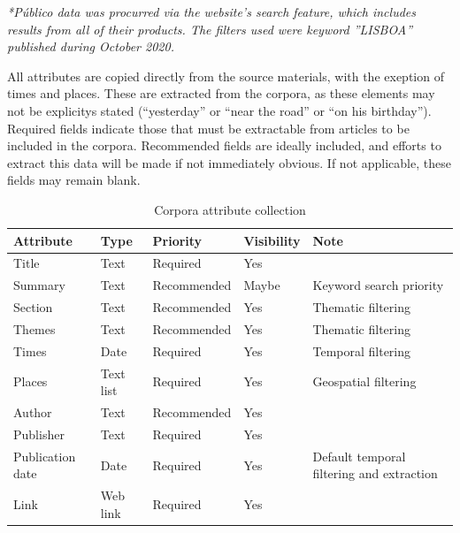 \textit{*Público data was procurred via the website's search feature, which includes results from all of their products.  The filters used were keyword ''LISBOA'' published during October 2020. }

All attributes are copied directly from the source materials, with the exeption of times and places. These are extracted from the corpora, as these elements may not be explicitys stated (``yesterday'' or ``near the road'' or ``on his birthday''). Required fields indicate those that must be extractable from articles to be included in the corpora. Recommended fields are ideally included, and efforts to extract this data will be made if not immediately obvious. If not applicable, these fields may remain blank. 

\begin{table} [H]
		\centering
		\begin{tabular}{| l l l l p{5cm} |}
			\hline
			\textbf{Attribute} & \textbf{Type} & \textbf{Priority} & \textbf{Visibility} & \textbf{Note} \\
			\hline
			Title & Text & Required & Yes & \\
			Summary & Text & Recommended & Maybe & Keyword search priority \\
			Section & Text & Recommended & Yes & Thematic filtering \\
			Themes & Text & Recommended & Yes & Thematic filtering \\
			Times & Date & Required & Yes & Temporal filtering \\
			Places & Text list & Required & Yes & Geospatial filtering \\
			Author & Text & Recommended & Yes & \\
			Publisher & Text & Required & Yes & \\
			Publication date & Date & Required & Yes & Default temporal filtering and extraction\\
			Link & Web link & Required  & Yes & \\
			\hline
		\end{tabular}
		\caption{Corpora attribute collection}
		\label{table:data_corpora}
\end{table}

